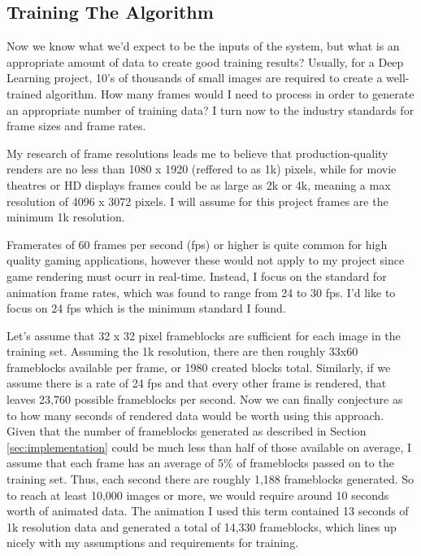 \documentclass[conference]{IEEEtran}
\begin{document}
\subsection{Training The Algorithm}
\label{subsec:training_the_algorithm}
Now we know what we'd expect to be the inputs of the system, but what is an
appropriate amount of data to create good training results?
Usually, for a Deep Learning project, 10's of thousands of small images
are required to create a well-trained algorithm.
How many frames would I need to process in order to generate an appropriate
number of training data? I turn now to the industry standards for frame sizes
and frame rates.

My research of frame resolutions leads me to believe that production-quality
renders are no less than 1080 x 1920 (reffered to as 1k) pixels, while for movie
theatres or HD displays frames could be as large as 2k or 4k, meaning a max
resolution of 4096 x 3072 pixels. I will assume for this project frames are the
minimum 1k resolution.

Framerates of 60 frames per second (fps) or higher is quite common for high quality gaming applications,
however these would not apply to my project since game rendering must ocurr in
real-time.
Instead, I focus on the standard for animation frame rates, which was found to
range from 24 to 30 fps. I'd like to focus on 24 fps which is the minimum
standard I found.

Let's assume that 32 x 32 pixel frameblocks are sufficient for each image in the
training set.
Assuming the 1k resolution, there are then roughly 33x60 frameblocks available per frame,
or 1980 created blocks total.
Similarly, if we assume there is a rate of 24 fps and that every other frame is
rendered,
that leaves 23,760 possible frameblocks per second.
Now we can finally conjecture as to how many seconds of rendered data would be
worth using this approach.
Given that the number of frameblocks generated as described in Section
\ref{sec:implementation} could be much less than half of those available on
average, I assume that each frame has an average of 5\% of frameblocks passed
on to the training set. Thus, each second there are roughly 1,188 frameblocks
generated. So to reach at least 10,000 images or more, we would require around
10 seconds worth of animated data.
The animation I used this term contained 13 seconds of 1k resolution data and generated
a total of 14,330 frameblocks, which lines up nicely with my assumptions and
requirements for training.
\end{document}

